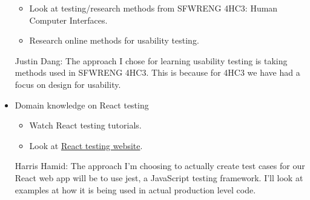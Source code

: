 \documentclass[12pt, titlepage]{article}
\begin{document}
\begin{itemize}
\begin{itemize}
        \item Look at testing/research methods from SFWRENG 4HC3: Human Computer Interfaces.
        \item Research online methods for usability testing.
    \end{itemize}
    Justin Dang: The approach I chose for learning usability testing is taking methods used in SFWRENG 4HC3. This is because for 4HC3 we have had a focus on design for usability.
    \item Domain knowledge on React testing
    \begin{itemize}
        \item Watch React testing tutorials.
        \item Look at \href{https://jestjs.io/docs/tutorial-react}{React testing website}.
    \end{itemize}
    Harris Hamid: The approach I'm choosing to actually create test cases for our React web app will be to use jest, a JavaScript testing framework. I'll look at examples at how it is being used in actual production level code.
\end{itemize}
\end{document}
